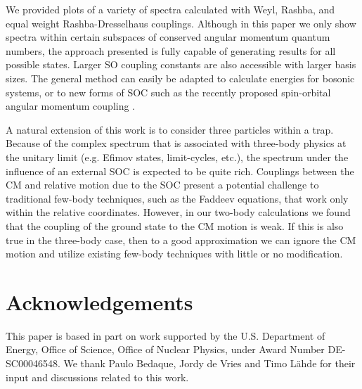 \documentclass[%
 notitlepage,
 preprint,
showpacs,%
 amsmath,amssymb,
 aps,
pra,
]{revtex4-1}
\begin{document}
We provided plots of a variety of spectra calculated with Weyl, Rashba, and equal weight Rashba-Dresselhaus couplings.  Although in this paper we only show spectra within certain subspaces of conserved angular momentum quantum numbers, the approach presented is fully capable of generating results for all possible states. Larger SO coupling constants are also accessible with larger basis sizes. The general method can easily be adapted to calculate energies for bosonic systems, or to new forms of SOC such as the recently proposed spin-orbital angular momentum coupling \cite{2014arXiv1411.1737S}.

A natural extension of this work is to consider three particles within a trap.  Because of the complex spectrum that is associated with three-body physics at the unitary limit (e.g. Efimov states, limit-cycles, etc.), the spectrum under the influence of an external SOC is expected to be quite rich.  Couplings between the CM and relative motion due to the SOC present a potential challenge to traditional few-body techniques, such as the Faddeev equations, that work only within the relative coordinates.  However, in our two-body calculations we found that the coupling of the ground state to the CM motion is weak. If this is also true in the three-body case, then to a good approximation we can ignore the CM motion and utilize existing few-body techniques with little or no modification.  

\section*{Acknowledgements}
This paper is based in part on work supported by the U.S. Department of Energy, Office of Science, Office of Nuclear Physics, under Award Number DE-SC00046548. We thank Paulo Bedaque, Jordy de Vries and Timo L{\"a}hde for their input and discussions related to this work.   

%


\appendix*
\end{document}

